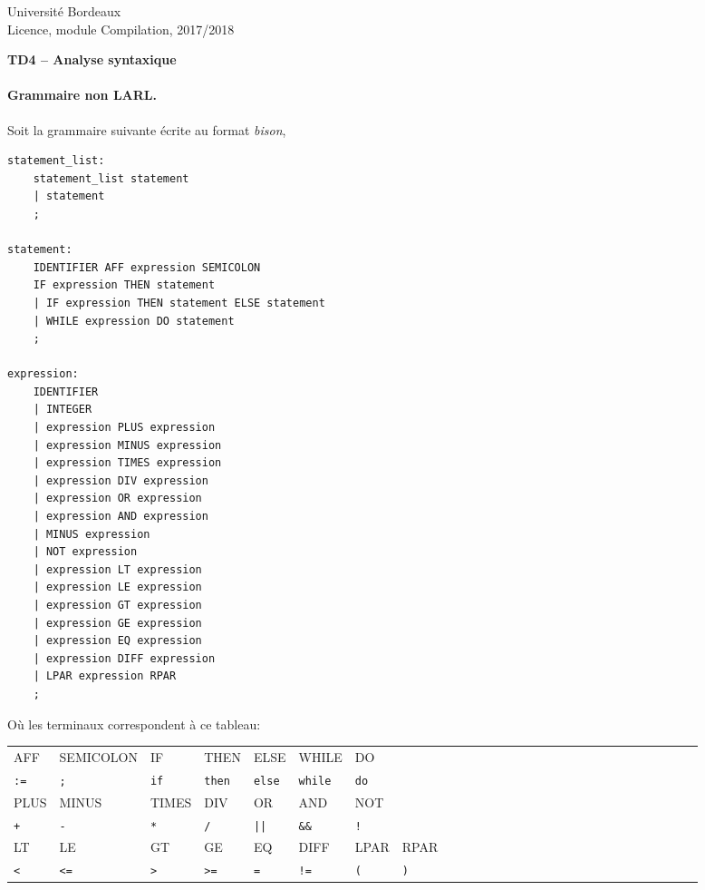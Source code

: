 \documentclass[11pt]{article}
\newcommand{\Num}{4}
\newcounter{numexercice}
\newenvironment{exercice}{\addtocounter{numexercice}{1}
\noindent{\large \bf Exercice {\Num}.\thenumexercice }}{\bigskip}
\begin{document}
\thispagestyle{empty}

\noindent
Université Bordeaux\\
Licence, module Compilation, 2017/2018 

\begin{center}
{\Large \bf  TD4 -- Analyse syntaxique}
\end{center}

\begin{exercice}
\paragraph{Grammaire non LARL.}
\par

Soit la grammaire suivante écrite au format \textit{bison}, 

\begin{lstlisting}
statement_list:
	statement_list statement
	| statement
	;

statement:
	IDENTIFIER AFF expression SEMICOLON
	IF expression THEN statement
	| IF expression THEN statement ELSE statement
	| WHILE expression DO statement
	;

expression:
	IDENTIFIER
	| INTEGER
	| expression PLUS expression
	| expression MINUS expression
	| expression TIMES expression
	| expression DIV expression
	| expression OR expression
	| expression AND expression
	| MINUS expression
	| NOT expression
	| expression LT expression
	| expression LE expression
	| expression GT expression
	| expression GE expression
	| expression EQ expression
	| expression DIFF expression
	| LPAR expression RPAR
	;
\end{lstlisting}

Où les terminaux correspondent à ce tableau:

\begin{tabular}{|l|l|l||l|l|l||l|l|l||l|l|l||l|l|l||l|l|l||l|l|l||l|l|l||l|l|l||l|}
\hline
AFF &SEMICOLON &IF &THEN &ELSE &WHILE &DO &\\
\verb#:=# & \verb#;# & \verb#if# & \verb#then# & \verb#else# & \verb#while# & \verb#do# &\\
\hline
\hline
PLUS & MINUS & TIMES & DIV & OR & AND & NOT&\\
\verb#+# & \verb#-# & \verb#*# & \verb#/# & \verb#||# & \verb#&&# & \verb#!# &\\
\hline
\hline
LT & LE & GT & GE & EQ & DIFF & LPAR & RPAR\\
\verb#<# & \verb#<=# & \verb#># & \verb#>=# & \verb#=# & \verb#!=# &
                                                                     \verb#(# & \verb#)#\\
\hline 
\end{tabular}



\end{exercice}
\end{document}

